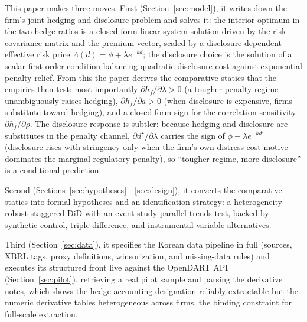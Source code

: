 \documentclass[11pt,a4paper]{article}
\begin{document}
This paper makes three moves. First (Section~\ref{sec:model}), it writes down the firm's joint hedging-and-disclosure problem and solves it: the interior optimum in the two hedge ratios is a closed-form linear-system solution driven by the risk covariance matrix and the premium vector, scaled by a disclosure-dependent effective risk price $\Lambda(d)=\phi+\lambda e^{-kd}$; the disclosure choice is the solution of a scalar first-order condition balancing quadratic disclosure cost against exponential penalty relief. From this the paper derives the comparative statics that the empirics then test: most importantly $\partial h_f/\partial\lambda>0$ (a tougher penalty regime unambiguously raises hedging), $\partial h_f/\partial a>0$ (when disclosure is expensive, firms substitute toward hedging), and a closed-form sign for the correlation sensitivity $\partial h_f/\partial\rho$. The disclosure response is subtler: because hedging and disclosure are substitutes in the penalty channel, $\partial d^\star/\partial\lambda$ carries the sign of $\phi-\lambda e^{-kd^\star}$ (disclosure rises with stringency only when the firm's own distress-cost motive dominates the marginal regulatory penalty), so ``tougher regime, more disclosure'' is a conditional prediction.

Second (Sections~\ref{sec:hypotheses}---\ref{sec:design}), it converts the comparative statics into formal hypotheses and an identification strategy: a heterogeneity-robust staggered DiD with an event-study parallel-trends test, backed by synthetic-control, triple-difference, and instrumental-variable alternatives.

Third (Section~\ref{sec:data}), it specifies the Korean data pipeline in full (sources, XBRL tags, proxy definitions, winsorization, and missing-data rules) and executes its structured front live against the OpenDART API (Section~\ref{sec:pilot}), retrieving a real pilot sample and parsing the derivative notes, which shows the hedge-accounting designation reliably extractable but the numeric derivative tables heterogeneous across firms, the binding constraint for full-scale extraction.
\end{document}
